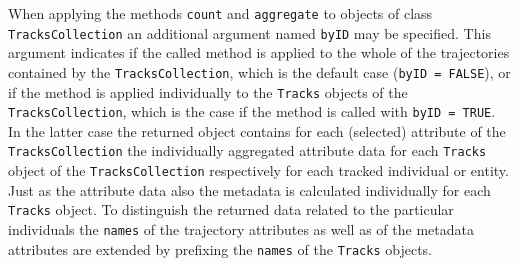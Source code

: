 \documentclass[12pt, oneside, a4paper]{scrbook}
\let\code=\texttt
\begin{document}
When applying the methods \code{count} and \code{aggregate} to objects of class \code{TracksCollection} an additional argument named \code{byID} may be specified. 
This argument indicates if the called method is applied to the whole of the trajectories contained by the \code{TracksCollection}, which is the default case (\code{byID = FALSE}), or if the method is applied individually to the \code{Tracks} objects of the \code{TracksCollection}, which is the case if the method is called with \code{byID = TRUE}.
In the latter case the returned object contains for each (selected) attribute of the \code{TracksCollection} the individually aggregated attribute data for each \code{Tracks} object of the \code{TracksCollection} respectively for each tracked individual or entity. Just as the attribute data also the metadata is calculated individually for each \code{Tracks} object. To distinguish the returned data related to the particular individuals the \code{names} of the trajectory attributes as well as of the metadata attributes are extended by prefixing the \code{names} of the \code{Tracks} objects.
\par\medskip
\end{document}
